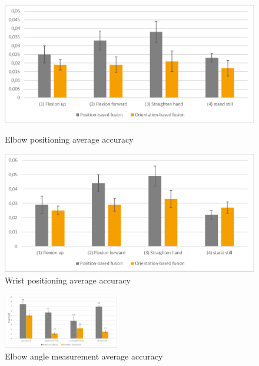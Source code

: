 \documentclass[9pt]{llncs}
\begin{document}
\begin{figure}[!htb]
	\centering
	\begin{minipage}[b]{0.49\linewidth}
		\centering   
		\includegraphics[width=\textwidth]{Fig13.eps}
		\caption{Elbow positioning average accuracy}
		\label{fig:positionElbow}
	\end{minipage}
	\begin{minipage}[b]{0.49\linewidth}
		\centering 
		\includegraphics[width=\textwidth]{Fig14.eps}
		\caption{Wrist positioning average accuracy}
		\label{fig:positionWrist}
	\end{minipage}
	
\end{figure}

\begin{figure}[!htb]
	\centering 
	\includegraphics[width=0.45\textwidth]{Fig15.eps}
	\caption{Elbow angle measurement average accuracy}
	\label{fig:angleError}
\end{figure}
\end{document}
